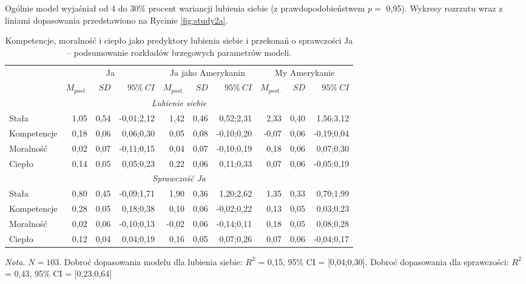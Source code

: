 \documentclass[man]{apa6}
\begin{document}
Ogólnie model wyjaśniał od 4 do 30\% procent wariancji lubienia siebie (z prawdopodobieństwem $p =$ 0,95). Wykresy rozrzutu wraz z liniami dopasowania przedstawiono na Rycinie \ref{fig:study2a}.\\

\begin{table*}[htbp]
\vspace*{2em}
\centering
\begin{threeparttable}
\caption{Kompetencje, moralność i ciepło jako predyktory lubienia siebie i przekonań o sprawczości Ja -- podsumowanie rozkładów brzegowych parametrów modeli.}
\label{tab:2}
\bgroup
\def\tabcolsep{4pt}
\begin{tabular}{lrrrrrrrrr}
\midrule
 &
\multicolumn{3}{c}{Ja} &
\multicolumn{3}{c}{Ja jako Amerykanin} &
\multicolumn{3}{c}{My Amerykanie} \\
\cline{2-10}
 & $M_{post.}$    & $SD$   & $95\%\ CI$   & $M_{post.}$    & $SD$   & $95\%\ CI$   & $M_{post.}$    & $SD$   & $95\%\ CI$   \\
\midrule
 \multicolumn{10}{c}{\emph{Lubienie siebie}}  \\
 Stała       &  1,05 & 0,54 & -0,01;2,12 &  1,42 & 0,46 &  0,52;2,31 &  2,33 & 0,40 &  1,56;3,12 \\
 Kompetencje &  0,18 & 0,06 &  0,06;0,30 &  0,05 & 0,08 & -0,10;0,20 & -0,07 & 0,06 & -0,19;0,04 \\
 Moralność   &  0,02 & 0,07 & -0,11;0,15 &  0,04 & 0,07 & -0,10;0,19 &  0,18 & 0,06 &  0,07;0,30 \\
 Ciepło      &  0,14 & 0,05 &  0,05;0,23 &  0,22 & 0,06 &  0,11;0,33 &  0,07 & 0,06 & -0,05;0,19 \\
 \multicolumn{10}{c}{\emph{Sprawczość Ja}}  \\
 Stała       &  0,80 & 0,45 & -0,09;1,71 &  1,90 & 0,36 &  1,20;2,62 &  1,35 & 0,33 &  0,70;1,99 \\
 Kompetencje &  0,28 & 0,05 &  0,18;0,38 &  0,10 & 0,06 & -0,02;0,22 &  0,13 & 0,05 &  0,03;0,23 \\
 Moralność   &  0,02 & 0,06 & -0,10;0,13 & -0,02 & 0,06 & -0,14;0,11 &  0,18 & 0,05 &  0,08;0,28 \\
 Ciepło      &  0,12 & 0,04 &  0,04;0,19 &  0,16 & 0,05 &  0,07;0,26 &  0,07 & 0,06 & -0,04;0,17 \\
\bottomrule
\end{tabular}
\egroup
\begin{tablenotes}
{\small
\textit{Nota.} $N = 103$. Dobroć dopasowania modelu dla lubienia siebie: $R^2$ = 0,15, 95\% CI = [0,04;0,30]. Dobroć dopasowania dla sprawczości: $R^2$ = 0,43, 95\% CI = [0,23;0,64]
}
\end{tablenotes}
\end{threeparttable}
\end{table*}
\end{document}
